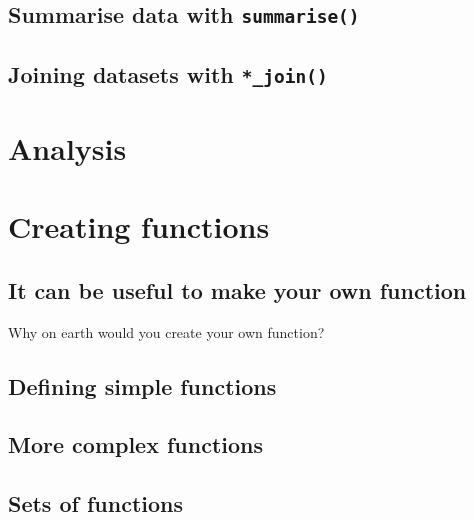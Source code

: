 \documentclass[]{book}
\begin{document}
\hypertarget{summarise-data-with-summarise}{%
\section{\texorpdfstring{Summarise data with \texttt{summarise()}}{Summarise data with summarise()}}\label{summarise-data-with-summarise}}

\hypertarget{joining-datasets-with-_join}{%
\section{\texorpdfstring{Joining datasets with \texttt{*\_join()}}{Joining datasets with *\_join()}}\label{joining-datasets-with-_join}}

\hypertarget{analysis}{%
\chapter{Analysis}\label{analysis}}

\hypertarget{creating-functions}{%
\chapter{Creating functions}\label{creating-functions}}

\hypertarget{it-can-be-useful-to-make-your-own-function}{%
\section{It can be useful to make your own function}\label{it-can-be-useful-to-make-your-own-function}}

Why on earth would you create your own function?

\hypertarget{defining-simple-functions}{%
\section{Defining simple functions}\label{defining-simple-functions}}

\hypertarget{more-complex-functions}{%
\section{More complex functions}\label{more-complex-functions}}

\hypertarget{sets-of-functions}{%
\section{Sets of functions}\label{sets-of-functions}}
\end{document}
